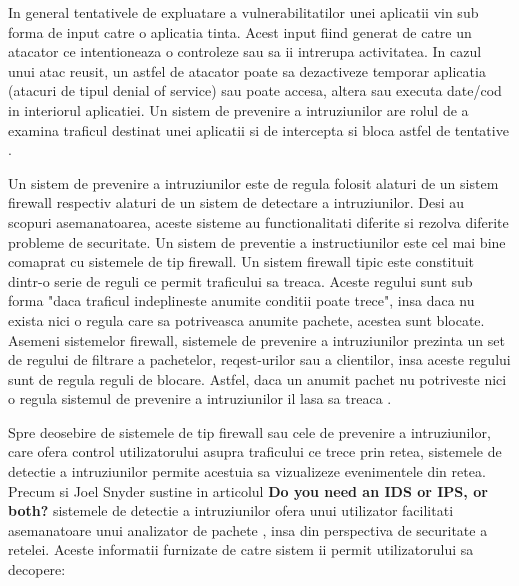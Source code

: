 In general tentativele de expluatare a vulnerabilitatilor unei aplicatii vin sub forma de input catre o aplicatia tinta. Acest input fiind generat de catre un atacator ce intentioneaza o controleze sau sa ii intrerupa activitatea. In cazul unui atac reusit, un astfel de atacator poate sa dezactiveze temporar aplicatia (atacuri de tipul denial of service) sau poate accesa, altera sau executa date/cod in interiorul aplicatiei. Un sistem de prevenire a intruziunilor are rolul de a examina traficul destinat unei aplicatii si de intercepta si bloca astfel de tentative \cite{what_is_ips}.

Un sistem de prevenire a intruziunilor este de regula folosit alaturi de un sistem firewall respectiv alaturi de un sistem de detectare a intruziunilor. Desi au scopuri asemanatoarea, aceste sisteme au functionalitati diferite si rezolva diferite probleme de securitate. Un sistem de preventie a instructiunilor este cel mai bine comaprat cu sistemele de tip firewall. Un sistem firewall tipic este constituit dintr-o serie de reguli ce permit traficului sa treaca. Aceste regului sunt sub forma "daca traficul indeplineste anumite conditii poate trece", insa daca nu exista nici o regula care sa potriveasca anumite pachete, acestea sunt blocate. Asemeni sistemelor firewall, sistemele de prevenire a intruziunilor prezinta un set de regului de filtrare a pachetelor, reqest-urilor  sau a clientilor, insa aceste regului sunt de regula reguli de blocare. Astfel, daca un anumit pachet nu potriveste nici o regula sistemul de prevenire a intruziunilor il lasa sa treaca \cite{ips_ids}.

Spre deosebire de sistemele de tip firewall sau cele de prevenire a intruziunilor, care ofera control utilizatorului asupra traficului ce trece prin retea, sistemele de detectie a intruziunilor permite acestuia sa vizualizeze evenimentele din retea. Precum si Joel Snyder sustine in articolul \textbf{Do you need an IDS or IPS, or both?} \cite{ips_ids}  sistemele de detectie a intruziunilor ofera unui utilizator facilitati asemanatoare unui analizator de pachete \cite{net_an}, insa din perspectiva de securitate a retelei. Aceste informatii furnizate de catre sistem ii permit utilizatorului sa decopere: 
 

